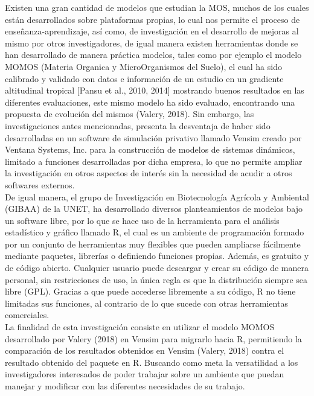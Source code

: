 Existen una gran cantidad de modelos que estudian la MOS, muchos de los cuales están desarrollados sobre plataformas propias, lo cual nos permite el proceso de enseñanza-aprendizaje, así como, de investigación en el desarrollo de mejoras al mismo por otros investigadores, de igual manera existen herramientas donde se han desarrollado de manera práctica modelos, tales como por ejemplo el modelo MOMOS (Materia Organica y MicroOrganismos del Suelo), el cual ha sido calibrado y validado con datos e información de un estudio en un gradiente altitudinal tropical [Pansu et al., 2010, 2014] mostrando buenos resultados en las diferentes evaluaciones, este mismo modelo ha sido evaluado, encontrando una propuesta de evolución del mismos (Valery, 2018). Sin embargo, las investigaciones antes mencionadas, presenta la desventaja de haber sido desarrolladas en un software de simulación privativo llamado Vensim creado por Ventana Systems, Inc. para la construcción de modelos de sistemas dinámicos, limitado a funciones desarrolladas por dicha empresa, lo que no permite ampliar la investigación en otros aspectos de interés sin la necesidad de acudir a otros softwares externos.\\

De igual manera, el grupo de Investigación en Biotecnología Agrícola y Ambiental (GIBAA) de la UNET, ha desarrollado diversos planteamientos de modelos bajo un software libre, por lo que se hace uso de la herramienta para el análisis estadístico y gráfico llamado R, el cual es un ambiente de programación formado por un conjunto de herramientas muy flexibles que pueden ampliarse fácilmente mediante paquetes, librerías o definiendo funciones propias. Además, es gratuito y de código abierto. Cualquier usuario puede descargar y crear su código de manera personal, sin restricciones de uso, la única regla es que la distribución siempre sea libre (GPL). Gracias a que puede accederse libremente a su código, R no tiene limitadas sus funciones, al contrario de lo que sucede con otras herramientas comerciales. \\

La finalidad de esta investigación consiste en utilizar el modelo MOMOS desarrollado por Valery (2018) en Vensim para migrarlo hacia R, permitiendo la comparación de los resultados obtenidos en Vensim (Valery, 2018) contra el resultado obtenido del paquete en R. Buscando como meta la versatilidad a los investigadores interesados de poder trabajar sobre un ambiente que puedan manejar y modificar con las diferentes necesidades de su trabajo.\\




